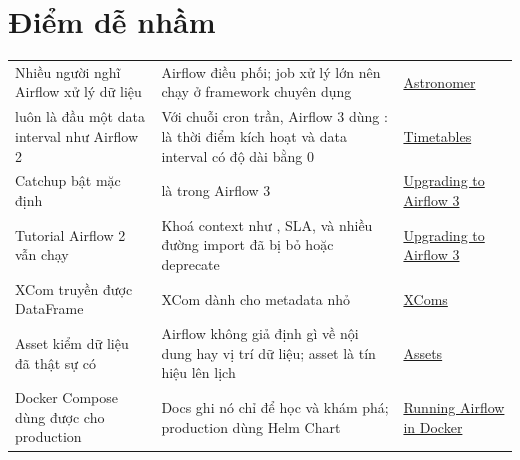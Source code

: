 \section{Điểm dễ nhầm}
\begin{xltabular}{\textwidth}{@{}P{4.2cm} L P{3.4cm}@{}}
\toprule
{} &  &  \\
\midrule
\endhead
\bottomrule
\endfoot
Nhiều người nghĩ Airflow xử lý dữ liệu & Airflow điều phối; job xử lý lớn nên chạy ở framework chuyên dụng & \href{https://www.astronomer.io/docs/airflow/dag-best-practices}{Astronomer} \\
 luôn là đầu một data interval như Airflow 2 & Với chuỗi cron trần, Airflow 3 dùng :  là thời điểm kích hoạt và data interval có độ dài bằng 0 & \href{https://airflow.apache.org/docs/apache-airflow/stable/authoring-and-scheduling/timetable.html}{Timetables} \\
Catchup bật mặc định &  là  trong Airflow 3 & \href{https://airflow.apache.org/docs/apache-airflow/stable/installation/upgrading_to_airflow3.html}{Upgrading to Airflow 3} \\
Tutorial Airflow 2 vẫn chạy & Khoá context như , SLA,  và nhiều đường import đã bị bỏ hoặc deprecate & \href{https://airflow.apache.org/docs/apache-airflow/stable/installation/upgrading_to_airflow3.html}{Upgrading to Airflow 3} \\
XCom truyền được DataFrame & XCom dành cho metadata nhỏ & \href{https://airflow.apache.org/docs/apache-airflow/stable/core-concepts/xcoms.html}{XComs} \\
Asset kiểm dữ liệu đã thật sự có & Airflow không giả định gì về nội dung hay vị trí dữ liệu; asset là tín hiệu lên lịch & \href{https://airflow.apache.org/docs/apache-airflow/stable/authoring-and-scheduling/assets.html}{Assets} \\
Docker Compose dùng được cho production & Docs ghi nó chỉ để học và khám phá; production dùng Helm Chart & \href{https://airflow.apache.org/docs/apache-airflow/stable/howto/docker-compose/index.html}{Running Airflow in Docker} \\
\end{xltabular}

